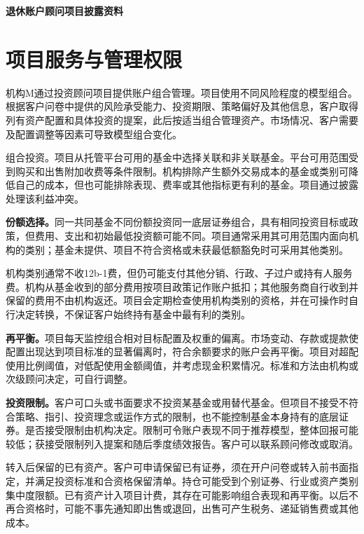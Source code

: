 \documentclass[UTF8,fontset=none,11pt,a4paper]{ctexart}
\begin{document}
{\noindent\fontsize{20}{25}\selectfont\bfseries 退休账户顾问项目披露资料\par}
\vspace{10pt}
\section*{项目服务与管理权限}
机构M通过投资顾问项目提供账户组合管理。项目使用不同风险程度的模型组合。根据客户问卷中提供的风险承受能力、投资期限、策略偏好及其他信息，客户取得列有资产配置和具体投资的提案，此后按适当组合管理资产。市场情况、客户需要及配置调整等因素可导致模型\allowbreak\mbox{组合变化。}


组合投资。项目从托管平台可用的基金中选择关联和非关联基金。平台可用范围受到购买和出售附加收费等条件限制。机构排除产生额外交易成本的基金或类别可降低自己的成本，但也可能排除表现、费率或其他指标更有利的基金。项目通过披露处理该\allowbreak\mbox{利益冲突。}


\textbf{份额选择。}同一共同基金不同份额投资同一底层证券组合，具有相同投资目标或政策，但费用、支出和初始最低投资额可能不同。项目通常采用其可用范围内面向机构的类别；基金未提供、项目不符合资格或未获最低额豁免时可采用\allowbreak\mbox{其他类别。}


机构类别通常不收12b-1费，但仍可能支付其他分销、行政、子过户或持有人服务费。机构从基金收到的部分费用按项目政策记作账户抵扣；其他服务商自行收到并保留的费用不由机构返还。项目会定期检查使用机构类别的资格，并在可操作时自行决定转换，不保证客户始终持有基金中最有\allowbreak\mbox{利的类别。}


\textbf{再平衡。}项目每天监控组合相对目标配置及权重的偏离。市场变动、存款或提款使配置出现达到项目标准的显著偏离时，符合余额要求的账户会再平衡。项目对超配使用比例阈值，对低配使用金额阈值，并考虑现金积累情况。标准和方法由机构或次级顾问决定，可\allowbreak\mbox{自行调整。}


\textbf{投资限制。}客户可口头或书面要求不投资某基金或用替代基金。但项目不接受不符合策略、指引、投资理念或运作方式的限制，也不能控制基金本身持有的底层证券。是否接受限制由机构决定。限制可令账户表现不同于推荐模型，整体回报可能较低；获接受限制列入提案和随后季度绩效报告。客户可以联系顾问修\allowbreak\mbox{改或取消。}


转入后保留的已有资产。客户可申请保留已有证券，须在开户问卷或转入前书面指定，并满足投资标准和合资格保留清单。持仓可能受到个别证券、行业或资产类别集中度限额。已有资产计入项目计费，其存在可能影响组合表现和再平衡。以后不再合资格时，可能不事先通知即出售或退回，出售可产生税务、递延销售费或\allowbreak\mbox{其他成本。}
\end{document}
